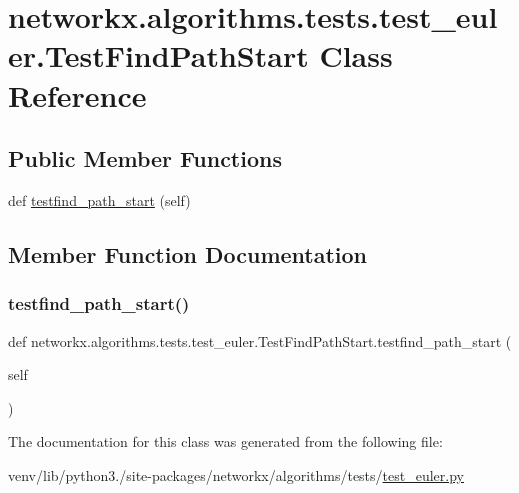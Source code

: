 \hypertarget{classnetworkx_1_1algorithms_1_1tests_1_1test__euler_1_1TestFindPathStart}{}\section{networkx.\+algorithms.\+tests.\+test\+\_\+euler.\+Test\+Find\+Path\+Start Class Reference}
\label{classnetworkx_1_1algorithms_1_1tests_1_1test__euler_1_1TestFindPathStart}
\subsection*{Public Member Functions}
\begin{DoxyCompactItemize}
\item 
def \hyperlink{classnetworkx_1_1algorithms_1_1tests_1_1test__euler_1_1TestFindPathStart_a19f39a57da94d43baeaa4bf15820b7a4}{testfind\+\_\+path\+\_\+start} (self)
\end{DoxyCompactItemize}


\subsection{Member Function Documentation}
\mbox{\label{classnetworkx_1_1algorithms_1_1tests_1_1test__euler_1_1TestFindPathStart_a19f39a57da94d43baeaa4bf15820b7a4}} 
\subsubsection{\texorpdfstring{testfind\+\_\+path\+\_\+start()}{testfind\_path\_start()}}
{\footnotesize\ttfamily def networkx.\+algorithms.\+tests.\+test\+\_\+euler.\+Test\+Find\+Path\+Start.\+testfind\+\_\+path\+\_\+start (\begin{DoxyParamCaption}\item[{}]{self }\end{DoxyParamCaption})}



The documentation for this class was generated from the following file\+:\begin{DoxyCompactItemize}
\item 
venv/lib/python3./site-\/packages/networkx/algorithms/tests/\hyperlink{test__euler_8py}{test\+\_\+euler.\+py}\end{DoxyCompactItemize}
